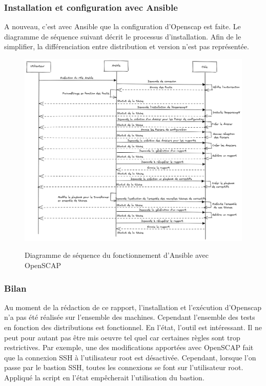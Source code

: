 \documentclass[12pt]{article}
\begin{document}
\subsubsection{Installation et configuration avec Ansible}
A nouveau, c'est avec Ansible que la configuration d'Openscap est faite. 
Le diagramme de séquence suivant décrit le processus d'installation. 
Afin de le simplifier, la différenciation entre distribution et version n'est pas représentée.

\begin{figure}[!ht]
    \centering
    \includegraphics[width=\textwidth]{src/Ansible oscap.png}
    \label{fig:ansible_oscap}
    \caption{Diagramme de séquence du fonctionnement d'Ansible avec OpenSCAP}
\end{figure}

\newpage
\subsubsection{Bilan}
Au moment de la rédaction de ce rapport, l'installation et l'exécution d'Openscap n'a pas été réalisée sur l'ensemble des machines. 
Cependant l'ensemble des tests en fonction des distributions est fonctionnel.
En l'état, l'outil est intéressant. 
Il ne peut pour autant pas être mis oeuvre tel quel car certaines règles sont trop restrictives.
Par exemple, une des modifications apportées avec OpenSCAP fait que la connexion SSH à l'utilisateur root est désactivée.
Cependant, lorsque l'on passe par le bastion SSH, toutes les connexions se font sur l'utilisateur root.
Appliqué la script en l'état empêcherait l'utilisation du bastion.
\end{document}
